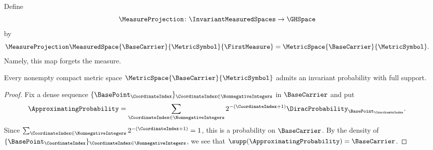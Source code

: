 Define
\[
 \MeasureProjection\colon\InvariantMeasuredSpaces\to\GHSpace
\]
by
\[
 \MeasureProjection\MeasuredSpace{\BaseCarrier}{\MetricSymbol}{\FirstMeasure}
 =\MetricSpace{\BaseCarrier}{\MetricSymbol}.
\]
Namely, this map forgets the measure.
\begin{lemma}\label{lem:invariant-full-support}
Every nonempty compact metric space
$\MetricSpace{\BaseCarrier}{\MetricSymbol}$
admits an invariant probability with full support.
\end{lemma}

\begin{proof}
Fix a dense sequence
$\{\BasePoint_\CoordinateIndex\}_{\CoordinateIndex\in\NonnegativeIntegers}$
in
$\BaseCarrier$
and put
\[
 \ApproximatingProbability
 =\sum_{\CoordinateIndex\in\NonnegativeIntegers}
   2^{-(\CoordinateIndex+1)}\DiracProbability_{\BasePoint_\CoordinateIndex}.
\]
Since
$\sum_{\CoordinateIndex\in\NonnegativeIntegers}2^{-(\CoordinateIndex+1)}=1$,
this is a probability on
$\BaseCarrier$.
By the density of
$\{\BasePoint_\CoordinateIndex\}_{\CoordinateIndex\in\NonnegativeIntegers}$,
we see that
$\supp(\ApproximatingProbability)=\BaseCarrier$.


\end{proof}
